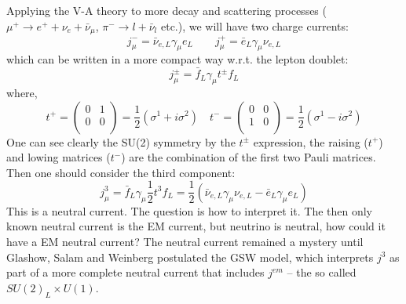 Applying the V-A theory to more decay and scattering processes 
( $\mu^+ \rightarrow e^+ + \nu_e + \bar{\nu}_\mu$, $\pi^- \rightarrow l + \bar{\nu}_l$ etc.), 
we will have two charge currents:
\begin{equation}
    j_\mu^- = \bar{\nu}_{e, L} \gamma_\mu e_L	\qquad 
    j_\mu^+ = \bar{e}_L \gamma_\mu \nu_{e,L}
\end{equation}
which can be written in a more compact way w.r.t. the lepton doublet:
\begin{equation}
    j_\mu^\pm = \bar{f}_L \gamma_\mu t^\pm f_L
\end{equation}
where,
\begin{equation}
    t^+  =
    \begin{pmatrix}
	0   & 1	\\
	0   & 0	\\
    \end{pmatrix}
    = \frac{1}{2}(\sigma^1 + i\sigma^2)
    \quad
    t^-  =
    \begin{pmatrix}
	0   & 0	\\
	1   & 0	\\
    \end{pmatrix}
    = \frac{1}{2}(\sigma^1 - i\sigma^2)
\end{equation}
One can see clearly the SU(2) symmetry by the $t^\pm$ expression, the raising ($t^+$)
and lowing matrices ($t^-$) are the combination of the first two Pauli matrices.
Then one should consider the third component:
\begin{equation}
    j_\mu^3 = \bar{f}_L \gamma_\mu \frac{1}{2}t^3 f_L = \frac{1}{2} (\bar{\nu}_{e, L} \gamma_\mu \nu_{e, L} - \bar{e}_{L} \gamma_\mu e_L)
\end{equation}
This is a neutral current. The question is how to interpret it.
The then only known neutral current is the EM current, but neutrino is neutral, how
could it have a EM neutral current? The neutral current remained a mystery until
Glashow, Salam and Weinberg postulated the GSW model, which interprets $j^3$ as
part of a more complete neutral current that includes $j^{em}$ -- the so called
$SU(2)_L \times U(1)$.

